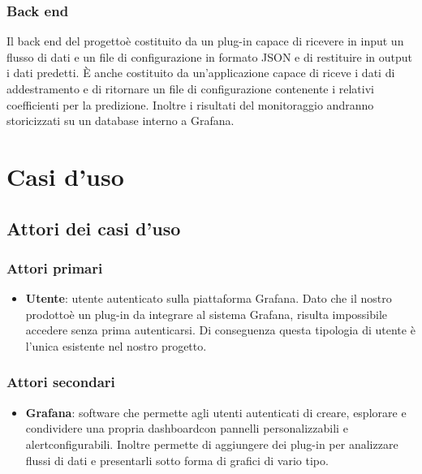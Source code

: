 		\subsubsection{Back end}
		Il back end del progetto\glosp è costituito da un plug-in capace di ricevere in input un flusso di dati e un file di configurazione in formato JSON e di restituire in output i dati predetti. È anche costituito da un'applicazione capace di riceve i dati di addestramento e di ritornare un file di configurazione contenente i relativi coefficienti per la predizione. Inoltre i risultati del monitoraggio andranno storicizzati su un database interno a Grafana\glo.
\section{Casi d'uso}
	\subsection{Attori dei casi d'uso}
		\subsubsection{Attori primari}
		\begin{itemize}
			\item \textbf{Utente}: utente autenticato sulla piattaforma Grafana\glo. Dato che il nostro prodotto\glosp è un plug-in da integrare al sistema Grafana\glo, risulta impossibile accedere senza prima autenticarsi. Di conseguenza questa tipologia di utente è l'unica esistente nel nostro progetto\glo.
		\end{itemize}
		\subsubsection{Attori secondari}
		\begin{itemize}
			\item \textbf{Grafana}\glo: software che permette agli utenti autenticati di creare, esplorare e condividere una propria dashboard\glosp con pannelli personalizzabili e alert\glosp configurabili. Inoltre permette di aggiungere dei plug-in per analizzare flussi di dati e presentarli sotto forma di grafici di vario tipo.
		\end{itemize}
